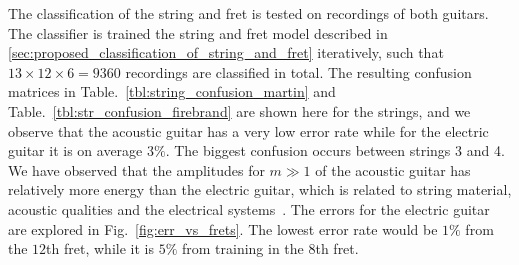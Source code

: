 \documentclass{article}
\begin{document}
%    
%
%
%
%
\label{sec:string_fret_classification}
The classification of the string and fret is tested on recordings of both guitars. 
The classifier is trained the string and fret model described in \ref{sec:proposed_classification_of_string_and_fret} iteratively, such that $13\times12\times6 = 9360$ recordings are classified in total. The resulting confusion matrices in Table.~\ref{tbl:string_confusion_martin} and Table.~\ref{tbl:str_confusion_firebrand} are shown here for the strings, and we observe that the acoustic guitar has a very low error rate while for the electric guitar it is on average $3\%$. The biggest confusion occurs between strings 3 and 4. We have observed that the amplitudes for $m\gg1$ of the acoustic guitar has relatively more energy than the electric guitar, which is related to string material, acoustic qualities and the electrical systems~\cite{fletcher:physics_of_musical_instruments}.  
The errors for the electric guitar are explored in Fig.~\ref{fig:err_vs_frets}. The lowest error rate would be $1\%$ from the $12$th fret, while it is $5\%$ from training in the $8$th fret. %
%
\end{document}
